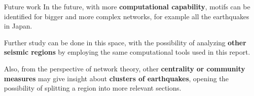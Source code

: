 \documentclass[10pt]{beamer}
\begin{document}
\begin{frame}{Future work}
In the future, with more {\bf computational capability}, motifs can be identified for bigger and more complex networks, for example all the earthquakes in Japan. \par 

\vspace{5mm} 

Further study can be done in this space, with the possibility of analyzing {\bf other seismic regions} by employing the same computational tools used in this report. \par

\vspace{5mm} 

Also, from the perspective of network theory, other {\bf centrality or community measures} may give insight about {\bf clusters of earthquakes}, opening the possibility of splitting a region into more relevant sections. 
\end{frame}



%
%

\end{document}
